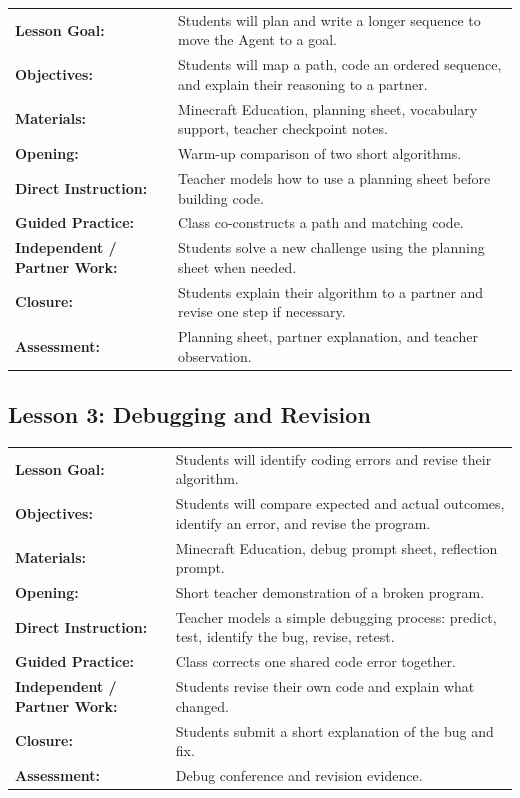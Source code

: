 \documentclass[12pt]{article}
\begin{document}
\begin{tabular}{@{}P{1.7in}P{4.3in}@{}}
\textbf{Lesson Goal:} & Students will plan and write a longer sequence to move the Agent to a goal. \\
\textbf{Objectives:} & Students will map a path, code an ordered sequence, and explain their reasoning to a partner. \\
\textbf{Materials:} & Minecraft Education, planning sheet, vocabulary support, teacher checkpoint notes. \\
\textbf{Opening:} & Warm-up comparison of two short algorithms. \\
\textbf{Direct Instruction:} & Teacher models how to use a planning sheet before building code. \\
\textbf{Guided Practice:} & Class co-constructs a path and matching code. \\
\textbf{Independent / Partner Work:} & Students solve a new challenge using the planning sheet when needed. \\
\textbf{Closure:} & Students explain their algorithm to a partner and revise one step if necessary. \\
\textbf{Assessment:} & Planning sheet, partner explanation, and teacher observation. \\
\end{tabular}

\subsection{Lesson 3: Debugging and Revision}

\begin{tabular}{@{}P{1.7in}P{4.3in}@{}}
\textbf{Lesson Goal:} & Students will identify coding errors and revise their algorithm. \\
\textbf{Objectives:} & Students will compare expected and actual outcomes, identify an error, and revise the program. \\
\textbf{Materials:} & Minecraft Education, debug prompt sheet, reflection prompt. \\
\textbf{Opening:} & Short teacher demonstration of a broken program. \\
\textbf{Direct Instruction:} & Teacher models a simple debugging process: predict, test, identify the bug, revise, retest. \\
\textbf{Guided Practice:} & Class corrects one shared code error together. \\
\textbf{Independent / Partner Work:} & Students revise their own code and explain what changed. \\
\textbf{Closure:} & Students submit a short explanation of the bug and fix. \\
\textbf{Assessment:} & Debug conference and revision evidence. \\
\end{tabular}
\end{document}
